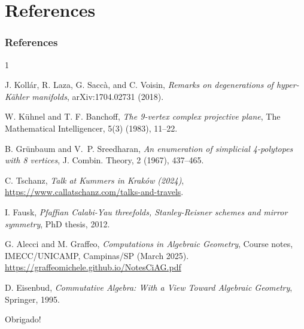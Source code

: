 \documentclass{beamer}
\begin{document}
\section*{References}
\label{section-ref}

\begin{frame}%
\frametitle{References}

{\scriptsize
\begin{thebibliography}{1}


J. Koll\'ar, R. Laza, G. Sacc\`a, and C. Voisin,
\emph{Remarks on degenerations of hyper-K\"ahler manifolds},
arXiv:1704.02731 (2018).

W. K{\"u}hnel and T. F. Banchoff,
\emph{The 9-vertex complex projective plane},
The Mathematical Intelligencer, 5(3) (1983), 11--22.

B. Grünbaum and V.~P. Sreedharan,
\emph{An enumeration of simplicial 4-polytopes with 8 vertices},
J. Combin. Theory, 2 (1967), 437–465.

C. Tschanz,
\emph{Talk at Kummers in Kraków (2024)},
\url{https://www.callatschanz.com/talks-and-travels}.

I. Fausk,
\emph{Pfaffian Calabi-Yau threefolds, Stanley-Reisner schemes and mirror symmetry},
PhD thesis, 2012.

G. Alecci and M. Graffeo,
\emph{Computations in Algebraic Geometry},
Course notes, IMECC/UNICAMP, Campinas/SP (March 2025).\\
\url{https://graffeomichele.github.io/NotesCiAG.pdf}

D. Eisenbud,
\emph{Commutative Algebra: With a View Toward Algebraic Geometry},
Springer, 1995.

\end{thebibliography}
}

\end{frame}

\begin{frame}%
\centering
\LARGE Obrigado!
\end{frame}



\end{document}

